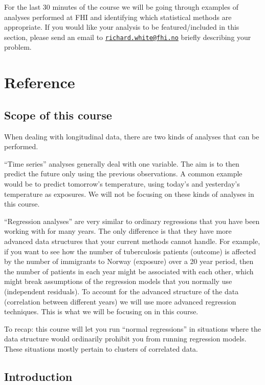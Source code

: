 \documentclass[]{book}
\begin{document}
For the last 30 minutes of the course we will be going through examples
of analyses performed at FHI and identifying which statistical methods
are appropriate. If you would like your analysis to be featured/included
in this section, please send an email to
\href{mailto:richard.white@fhi.no}{\nolinkurl{richard.white@fhi.no}}
briefly describing your problem.

\chapter{Reference}\label{reference}

\section{Scope of this course}\label{scope-of-this-course}

When dealing with longitudinal data, there are two kinds of analyses
that can be performed.

``Time series'' analyses generally deal with one variable. The aim is to
then predict the future only using the previous observations. A common
example would be to predict tomorrow's temperature, using today's and
yesterday's temperature as exposures. We will not be focusing on these
kinds of analyses in this course.

``Regression analyses'' are very similar to ordinary regressions that
you have been working with for many years. The only difference is that
they have more advanced data structures that your current methods cannot
handle. For example, if you want to see how the number of tuberculosis
patients (outcome) is affected by the number of immigrants to Norway
(exposure) over a 20 year period, then the number of patients in each
year might be associated with each other, which might break assumptions
of the regression models that you normally use (independent residuals).
To account for the advanced structure of the data (correlation between
different years) we will use more advanced regression techniques. This
is what we will be focusing on in this course.

To recap: this course will let you run ``normal regressions'' in
situations where the data structure would ordinarily prohibit you from
running regression models. These situations mostly pertain to clusters
of correlated data.

\newpage

\section{Introduction}\label{introduction}
\end{document}

